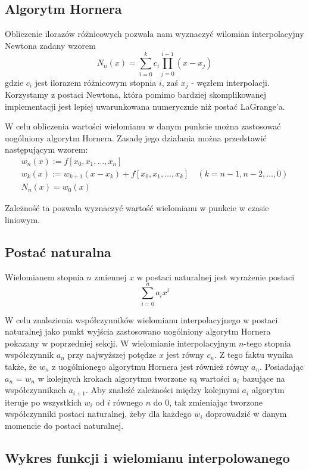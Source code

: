 \documentclass{article}
\begin{document}
\subsection{Algorytm Hornera}

Obliczenie ilorazów różnicowych pozwala nam wyznaczyć wilomian interpolacyjny Newtona zadany wzorem
$$
N_n(x) = \sum_{i=0}^k c_i \prod_{j=0}^{i-1}(x-x_j)
$$
gdzie $c_i$ jest ilorazem różnicowym stopnia $i$, zaś $x_j$ - węzłem interpolacji.
Korzystamy z postaci Newtona, która pomimo bardziej skomplikowanej implementacji jest lepiej uwarunkowana numerycznie niż postać LaGrange'a.

W celu obliczenia wartości wielomianu w danym punkcie można zastosować uogólniony algorytm Hornera.
Zasadę jego działania można przedstawić następującym wzorem:
$$
\begin{aligned}
	&w_n(x) := f[x_0, x_1, \ldots, x_n]&\\
	&w_k(x) := w_{k+1}(x-x_k)+ f[x_0, x_1, \ldots, x_k]	\quad(k=n-1, n-2, \ldots, 0)&\\
	&N_n(x) = w_0(x)
\end{aligned}
$$

Zależność ta pozwala wyznaczyć wartość wielomianu w punkcie w czasie liniowym.

\subsection{Postać naturalna}
Wielomianem stopnia $n$ zmiennej $x$ w postaci naturalnej jest wyrażenie postaci
$$
\sum_{i=0}^{n} a_ix^i
$$

W celu znalezienia współczynników wielomianu interpolacyjnego w postaci naturalnej jako punkt wyjścia zastosowano uogólniony algorytm Hornera pokazany w poprzedniej sekcji.
W wielomianie interpolacyjnym $n$-tego stopnia współczynnik $a_n$ przy najwyższej potędze $x$ jest równy $c_n$.
Z tego faktu wynika także, że  $w_n$ z uogólnionego algorytmu Hornera jest również równy $a_n$.
Posiadając $a_n$ = $w_n$ w kolejnych krokach algorytmu tworzone są wartości $a_i$ bazujące na współczynnikach $a_{i+1}$.
Aby znaleźć zależności między kolejnymi $a_i$ algorytm iteruje po wszystkich $w_i$ od $i$ równego $n$ do $0$, tak zmieniając tworzone współczynniki postaci naturalnej, żeby dla każdego $w_i$ doprowadzić w danym momencie do postaci naturalnej.

\subsection{Wykres funkcji i wielomianu interpolowanego}
\end{document}
